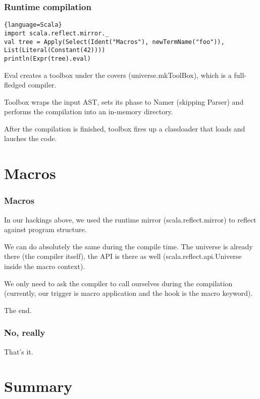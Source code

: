 \documentclass[hyperref={bookmarks=false}]{beamer}
\begin{document}
\begin{frame}[fragile]
\frametitle{Runtime compilation}

\begin{lstlisting}{language=Scala}
import scala.reflect.mirror._
val tree = Apply(Select(Ident("Macros"), newTermName("foo")), List(Literal(Constant(42))))
println(Expr(tree).eval)
\end{lstlisting}

Eval creates a toolbox under the covers (universe.mkToolBox), which is a full-fledged compiler.

Toolbox wraps the input AST, sets its phase to Namer (skipping Parser) and performs the compilation into an in-memory directory.

After the compilation is finished, toolbox fires up a classloader that loads and lauches the code.

\end{frame}

\section{Macros}

\begin{frame}[fragile]
\frametitle{Macros}

In our hackings above, we used the runtime mirror (scala.reflect.mirror) to reflect against program structure.

We can do absolutely the same during the compile time.
The universe is already there (the compiler itself), the API is there as well
(scala.reflect.api.Universe inside the macro context).

We only need to ask the compiler to call ourselves during the compilation
(currently, our trigger is macro application and the hook is the macro keyword).

The end.

\end{frame}

\begin{frame}[fragile]
\frametitle{No, really}

That's it.

\end{frame}

\section{Summary}
\end{document}
